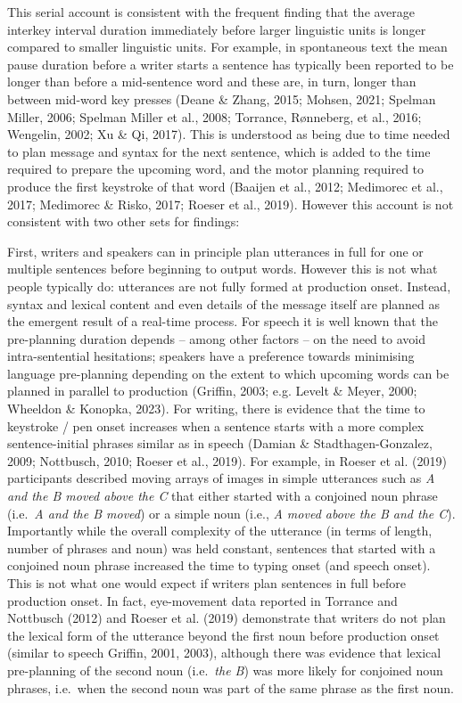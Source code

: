 \documentclass[
  man,floatsintext]{apa7}
\begin{document}
This serial account is consistent with the frequent finding that the average interkey interval duration immediately before larger linguistic units is longer compared to smaller linguistic units. For example, in spontaneous text the mean pause duration before a writer starts a sentence has typically been reported to be longer than before a mid-sentence word and these are, in turn, longer than between mid-word key presses (Deane \& Zhang, 2015; Mohsen, 2021; Spelman Miller, 2006; Spelman Miller et al., 2008; Torrance, Rønneberg, et al., 2016; Wengelin, 2002; Xu \& Qi, 2017). This is understood as being due to time needed to plan message and syntax for the next sentence, which is added to the time required to prepare the upcoming word, and the motor planning required to produce the first keystroke of that word (Baaijen et al., 2012; Medimorec et al., 2017; Medimorec \& Risko, 2017; Roeser et al., 2019). However this account is not consistent with two other sets for findings:

First, writers and speakers can in principle plan utterances in full for one or multiple sentences before beginning to output words. However this is not what people typically do: utterances are not fully formed at production onset. Instead, syntax and lexical content and even details of the message itself are planned as the emergent result of a real-time process. For speech it is well known that the pre-planning duration depends -- among other factors -- on the need to avoid intra-sentential hesitations; speakers have a preference towards minimising language pre-planning depending on the extent to which upcoming words can be planned in parallel to production (Griffin, 2003; e.g. Levelt \& Meyer, 2000; Wheeldon \& Konopka, 2023). For writing, there is evidence that the time to keystroke / pen onset increases when a sentence starts with a more complex sentence-initial phrases similar as in speech (Damian \& Stadthagen-Gonzalez, 2009; Nottbusch, 2010; Roeser et al., 2019). For example, in Roeser et al. (2019) participants described moving arrays of images in simple utterances such as \emph{A and the B moved above the C} that either started with a conjoined noun phrase (i.e.~\emph{A and the B moved}) or a simple noun (i.e., \emph{A moved above the B and the C}). Importantly while the overall complexity of the utterance (in terms of length, number of phrases and noun) was held constant, sentences that started with a conjoined noun phrase increased the time to typing onset (and speech onset). This is not what one would expect if writers plan sentences in full before production onset. In fact, eye-movement data reported in Torrance and Nottbusch (2012) and Roeser et al. (2019) demonstrate that writers do not plan the lexical form of the utterance beyond the first noun before production onset (similar to speech Griffin, 2001, 2003), although there was evidence that lexical pre-planning of the second noun (i.e.~\emph{the B}) was more likely for conjoined noun phrases, i.e.~when the second noun was part of the same phrase as the first noun.
\end{document}
